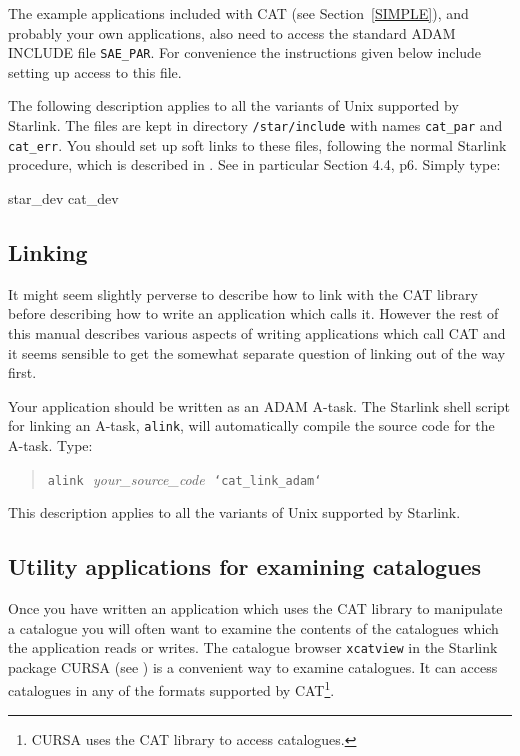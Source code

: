 \documentclass[11pt,twoside]{starlink}
\begin{document}
The example applications included with CAT (see Section~\ref{SIMPLE}),
and probably your own applications, also need to access the standard
ADAM INCLUDE file \texttt{SAE\_PAR}. For convenience the instructions
given below include setting up access to this file.

The following description applies to all the variants of Unix supported
by Starlink.  The files are kept in
directory \texttt{/star/include} with names \texttt{cat\_par} and \texttt{cat\_err}. You should set up soft links to these files, following the
normal Starlink procedure, which is described in
\cite{SUN111}.  See in particular Section 4.4,
p6.  Simply type:

\begin{terminalv}
star_dev
cat_dev
\end{terminalv}

\subsection{\label{LINK}Linking}

It might seem slightly perverse to describe how to link with the CAT
library before describing how to write an application which calls it.
However the rest of this manual describes various aspects of writing
applications which call CAT and it seems sensible to get the somewhat
separate question of linking out of the way first.

Your application should be written as an ADAM A-task.  The Starlink
shell script for linking an A-task, \texttt{alink}, will automatically compile
the source code for the A-task. Type:

\begin{verse}
\texttt{alink}\,\, \textit{your\_source\_code}\,\,  \texttt{`cat\_link\_adam`}
\end{verse}

This description applies to all the variants of Unix supported by
Starlink.

\subsection{\label{UTIL}Utility applications for examining catalogues}

Once you have written an application which uses the CAT library to
manipulate a catalogue you will often want to examine the contents of
the catalogues which the application reads or writes.  The catalogue
browser \texttt{xcatview} in the Starlink package CURSA (see
\cite{SUN190}) is a convenient way to examine
catalogues.  It can access catalogues in any of the formats supported
by CAT\footnote{CURSA uses the CAT library to access catalogues.}.
\end{document}
